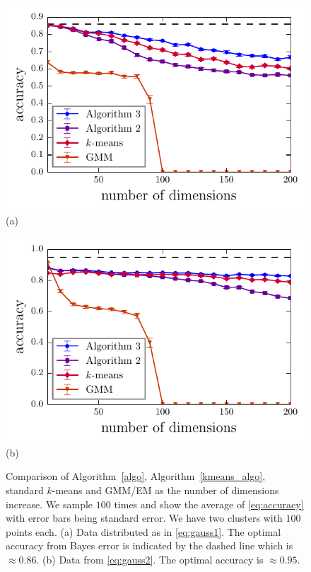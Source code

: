 \documentclass[aps,preprint,nofootinbib,floatfix]{revtex4-1}
\begin{document}
\begin{figure}
\begin{minipage}{0.49\textwidth}
\centering
\includegraphics[width=1\textwidth]{gauss_dim.pdf}\\[-1.0em]
(a)
\end{minipage}
\begin{minipage}{0.49\textwidth}
\centering
\includegraphics[width=1\textwidth]{gauss_cov.pdf}\\[-1.0em]
(b)
\end{minipage}
\caption{
\label{fig:gauss}
Comparison of Algorithm~\ref{algo}, Algorithm~\ref{kmeans_algo},
standard $k$-means and GMM/EM as the number of dimensions increase.
We sample $100$ times and show the average of \eqref{eq:accuracy} with
error bars being standard error. We have two clusters with $100$ points
each. 
(a) Data distributed as in \eqref{eq:gauss1}. The optimal accuracy
from Bayes error is indicated by the dashed line which is $\approx 0.86$.
(b) Data from \eqref{eq:gauss2}. The optimal accuracy is $\approx 0.95$.
}
\end{figure}
\end{document}
